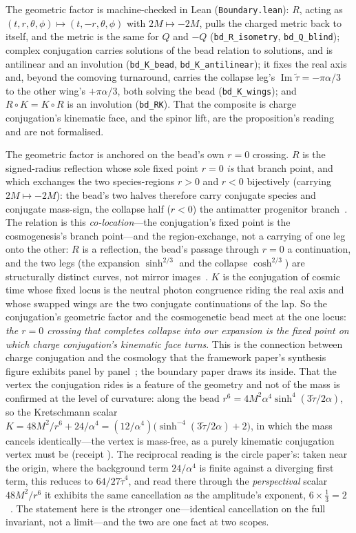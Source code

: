 \documentclass[11pt]{article}
\theoremstyle{plain}
\theoremstyle{remark}
\begin{document}
\noindent The geometric factor is machine-checked in Lean (\texttt{Boundary.lean}): $R$, acting as $(t,r,\theta,\phi)\mapsto(t,-r,\theta,\phi)$ with $2M\mapsto-2M$, pulls the charged metric back to itself, and the metric is the same for $Q$ and $-Q$ (\texttt{bd\_R\_isometry}, \texttt{bd\_Q\_blind}); complex conjugation carries solutions of the bead relation to solutions, and is antilinear and an involution (\texttt{bd\_K\_bead}, \texttt{bd\_K\_antilinear}); it fixes the real axis and, beyond the comoving turnaround, carries the collapse leg's $\operatorname{Im}\tilde\tau=-\pi\alpha/3$ to the other wing's $+\pi\alpha/3$, both solving the bead (\texttt{bd\_K\_wings}); and $R\circ K=K\circ R$ is an involution (\texttt{bd\_RK}). That the composite is charge conjugation's kinematic face, and the spinor lift, are the proposition's reading and are not formalised.

The geometric factor is anchored on the bead's own $r=0$ crossing. $R$ is the signed-radius reflection whose sole fixed point $r=0$ \emph{is} that branch point, and which exchanges the two species-regions $r>0$ and $r<0$ bijectively (carrying $2M\mapsto-2M$): the bead's two halves therefore carry conjugate species and conjugate mass-sign, the collapse half ($r<0$) the antimatter progenitor branch~\cite{JanzenCRframework}. The relation is this \emph{co-location}---the conjugation's fixed point is the cosmogenesis's branch point---and the region-exchange, not a carrying of one leg onto the other: $R$ is a reflection, the bead's passage through $r=0$ a continuation, and the two legs (the expansion $\sinh^{2/3}$ and the collapse $\cosh^{2/3}$) are structurally distinct curves, not mirror images~\cite{JanzenCRframework}. $K$ is the conjugation of cosmic time whose fixed locus is the neutral photon congruence riding the real axis and whose swapped wings are the two conjugate continuations of the lap. So the conjugation's geometric factor and the cosmogenetic bead meet at the one locus: \emph{the $r=0$ crossing that completes collapse into our expansion is the fixed point on which charge conjugation's kinematic face turns}. This is the connection between charge conjugation and the cosmology that the framework paper's synthesis figure exhibits panel by panel~\cite{JanzenCRframework}; the boundary paper draws its inside. That the vertex the conjugation rides is a feature of the geometry and not of the mass is confirmed at the level of curvature: along the bead $r^{6}=4M^{2}\alpha^{4}\sinh^{4}(3\tilde\tau/2\alpha)$, so the Kretschmann scalar $K=48M^{2}/r^{6}+24/\alpha^{4}=(12/\alpha^{4})\bigl(\sinh^{-4}(3\tilde\tau/2\alpha)+2\bigr)$, in which the mass cancels identically---the vertex is mass-free, as a purely kinematic conjugation vertex must be (receipt ). The reciprocal reading is the circle paper's: taken near the origin, where the background term $24/\alpha^{4}$ is finite against a diverging first term, this reduces to $64/27\tilde\tau^{4}$, and read there through the \emph{perspectival} scalar $48M^{2}/r^{6}$ it exhibits the same cancellation as the amplitude's exponent, $6\times\tfrac13=2$~\cite{JanzenCircle}. The statement here is the stronger one---identical cancellation on the full invariant, not a limit---and the two are one fact at two scopes.
\end{document}
